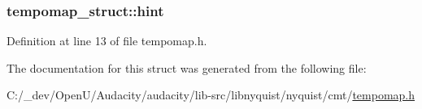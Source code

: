 \subsubsection[{\texorpdfstring{hint}{hint}}]{ tempomap\+\_\+struct\+::hint}\hypertarget{structtempomap__struct_a6b20b46e84c4f0a327b1125e2acce8c2}{}\label{structtempomap__struct_a6b20b46e84c4f0a327b1125e2acce8c2}


Definition at line 13 of file tempomap.\+h.



The documentation for this struct was generated from the following file\+:\begin{DoxyCompactItemize}
\item 
C\+:/\+\_\+dev/\+Open\+U/\+Audacity/audacity/lib-\/src/libnyquist/nyquist/cmt/\hyperlink{tempomap_8h}{tempomap.\+h}\end{DoxyCompactItemize}
